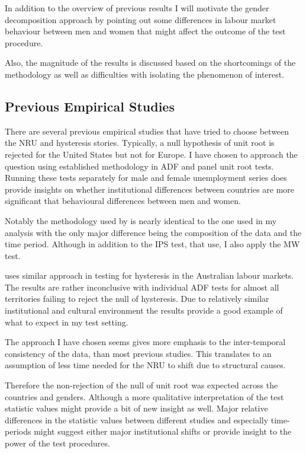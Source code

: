 \documentclass[12pt,a4paper,english]{article}
\begin{document}
In addition to the overview of previous results I will motivate the gender decomposition approach by pointing out some differences in labour market behaviour between men and women that might affect the outcome of the test procedure.

Also, the magnitude of the results is discussed based on the shortcomings of the methodology as well as difficulties with isolating the phenomenon of interest. 

\vspace{2cm}

\subsection{Previous Empirical Studies}

There are several previous empirical studies that have tried to choose between the NRU and hysteresis stories. Typically, a null hypothesis of unit root is rejected for the United States but not for Europe. I have chosen to approach the question using established methodology in ADF and panel unit root tests. Running these tests separately for male and female unemployment series does provide insights on whether institutional differences between countries are more significant that behavioural differences between men and women. \citep{roed1996, leon2002}

Notably the methodology used by \cite{leon2002} is nearly identical to the one used in my analysis with the only major difference being the composition of the data and the time period. Although in addition to the IPS test, that \cite{leon2002} use, I also apply the MW test.

\cite{smyth2003} uses similar approach in testing for hysteresis in the Australian labour markets. The results are rather inconclusive with individual ADF tests for almost all territories failing to reject the null of hysteresis. Due to relatively similar institutional and cultural environment the results provide a good example of what to expect in my test setting.

The approach I have chosen seems gives more emphasis to the inter-temporal consistency of the data, than most previous studies. This translates to an assumption of less time needed for the NRU to shift due to structural causes.

Therefore the non-rejection of the null of unit root was expected across the countries and genders. Although a more qualitative interpretation of the test statistic values might provide a bit of new insight as well. Major relative differences in the statistic values between different studies and especially time-periods might suggest either major institutional shifts or provide insight to the power of the test procedures. 
\end{document}
